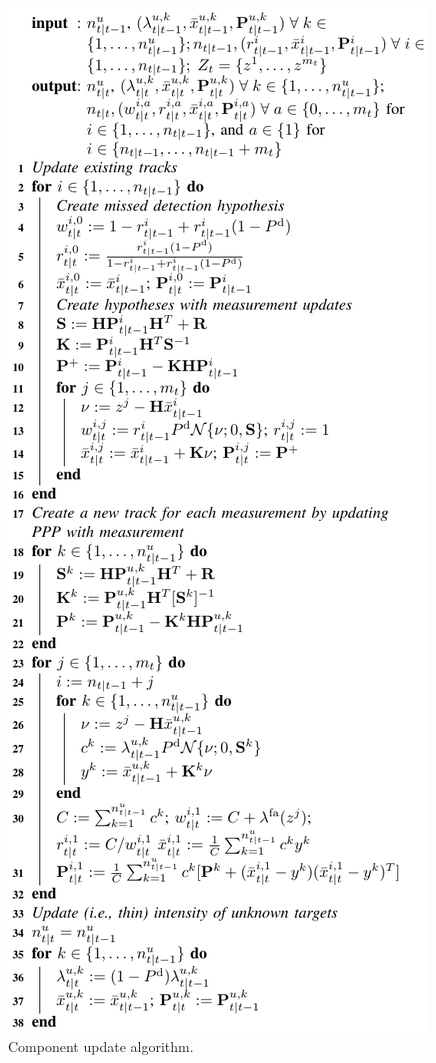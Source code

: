 \documentclass[journal,twoside]{IEEEtran}
\theoremstyle{plain}
\begin{document}
\begin{figure}
\includegraphics{figure8.pdf}
\fi
\caption{Component update algorithm.}
\label{fig:algUpdate}
\end{figure}
\end{document}
